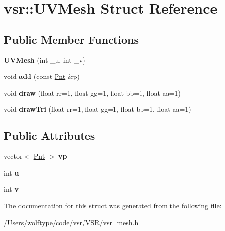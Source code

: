 \hypertarget{structvsr_1_1_u_v_mesh}{\section{vsr\-:\-:U\-V\-Mesh Struct Reference}
\label{structvsr_1_1_u_v_mesh}
}
\subsection*{Public Member Functions}
\begin{DoxyCompactItemize}
\item 
\hypertarget{structvsr_1_1_u_v_mesh_a6e43e5ff40d5c97239f784bb2f4f6767}{{\bfseries U\-V\-Mesh} (int \-\_\-u, int \-\_\-v)}\label{structvsr_1_1_u_v_mesh_a6e43e5ff40d5c97239f784bb2f4f6767}

\item 
\hypertarget{structvsr_1_1_u_v_mesh_a83818c3f15a9b9ff3c32f386276b944e}{void {\bfseries add} (const \hyperlink{namespacevsr_a2d05beb9721c5d9211b479af6d47222d}{Pnt} \&p)}\label{structvsr_1_1_u_v_mesh_a83818c3f15a9b9ff3c32f386276b944e}

\item 
\hypertarget{structvsr_1_1_u_v_mesh_aefdd40a8ca082c6be38c818d5d90c5cf}{void {\bfseries draw} (float rr=1, float gg=1, float bb=1, float aa=1)}\label{structvsr_1_1_u_v_mesh_aefdd40a8ca082c6be38c818d5d90c5cf}

\item 
\hypertarget{structvsr_1_1_u_v_mesh_a7b57f211b48d8088d847af230146e712}{void {\bfseries draw\-Tri} (float rr=1, float gg=1, float bb=1, float aa=1)}\label{structvsr_1_1_u_v_mesh_a7b57f211b48d8088d847af230146e712}

\end{DoxyCompactItemize}
\subsection*{Public Attributes}
\begin{DoxyCompactItemize}
\item 
\hypertarget{structvsr_1_1_u_v_mesh_a9fc90345affff8c0c3301274b4a5cf77}{vector$<$ \hyperlink{namespacevsr_a2d05beb9721c5d9211b479af6d47222d}{Pnt} $>$ {\bfseries vp}}\label{structvsr_1_1_u_v_mesh_a9fc90345affff8c0c3301274b4a5cf77}

\item 
\hypertarget{structvsr_1_1_u_v_mesh_a1db5ba94ab5a66a824ae13b2143b51e9}{int {\bfseries u}}\label{structvsr_1_1_u_v_mesh_a1db5ba94ab5a66a824ae13b2143b51e9}

\item 
\hypertarget{structvsr_1_1_u_v_mesh_aa780a429c2aa0be9e2358dc7c7d3936e}{int {\bfseries v}}\label{structvsr_1_1_u_v_mesh_aa780a429c2aa0be9e2358dc7c7d3936e}

\end{DoxyCompactItemize}


The documentation for this struct was generated from the following file\-:\begin{DoxyCompactItemize}
\item 
/\-Users/wolftype/code/vsr/\-V\-S\-R/vsr\-\_\-mesh.\-h\end{DoxyCompactItemize}
